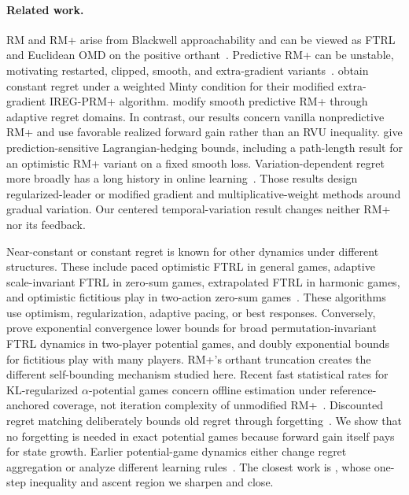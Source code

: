 \documentclass{article}
\begin{document}
\paragraph{Related work.} RM and RM+ arise from Blackwell approachability and can be viewed as FTRL and Euclidean OMD on the positive orthant~\citep{Hart00:Simple,Farina21:Faster}. Predictive RM+ can be unstable, motivating restarted, clipped, smooth, and extra-gradient variants~\citep{Farina23:Regret,Cai25:Last,Meng25:Smooth}. \citet{Zhang25:Scale} obtain constant regret under a weighted Minty condition for their modified extra-gradient IREG-PRM+ algorithm. \citet{Meng26:Faster} modify smooth predictive RM+ through adaptive regret domains. In contrast, our results concern vanilla nonpredictive RM+ and use favorable realized forward gain rather than an RVU inequality. \citet{Dorazio21:Optimistic} give prediction-sensitive Lagrangian-hedging bounds, including a path-length result for an optimistic RM+ variant on a fixed smooth loss. Variation-dependent regret more broadly has a long history in online learning~\citep{Hazan10:Variation,Chiang12:Gradual}. Those results design regularized-leader or modified gradient and multiplicative-weight methods around gradual variation. Our centered temporal-variation result changes neither RM+ nor its feedback.

Near-constant or constant regret is known for other dynamics under different structures. These include paced optimistic FTRL in general games, adaptive scale-invariant FTRL in zero-sum games, extrapolated FTRL in harmonic games, and optimistic fictitious play in two-action zero-sum games~\citep{Soleymani25:Cautious,Tsuchiya26:Scale,Legacci24:Harmonic,Lazarsfeld25:Optimism}. These algorithms use optimism, regularization, adaptive pacing, or best responses. Conversely, \citet{Anagnostides26:FTRL} prove exponential convergence lower bounds for broad permutation-invariant FTRL dynamics in two-player potential games, and doubly exponential bounds for fictitious play with many players. RM+'s orthant truncation creates the different self-bounding mechanism studied here. Recent fast statistical rates for KL-regularized $\alpha$-potential games concern offline estimation under reference-anchored coverage, not iteration complexity of unmodified RM+~\citep{Chen26:Offline}. Discounted regret matching deliberately bounds old regret through forgetting~\citep{Brown19:Discounted}. We show that no forgetting is needed in exact potential games because forward gain itself pays for state growth. Earlier potential-game dynamics either change regret aggregation or analyze different learning rules~\citep{Marden07:Regret,Kleinberg09:Multiplicative}. The closest work is \citet{Anagnostides26:Convergence}, whose one-step inequality and ascent region we sharpen and close.
\end{document}
